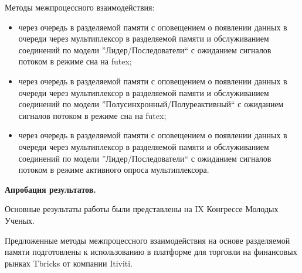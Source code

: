 Методы межпроцессного взаимодействия:
\begin{itemize}
\item через очередь в разделяемой памяти с оповещением о появлении данных в очереди через мультиплексор в разделяемой памяти и обслуживанием соединений по модели ''Лидер/Последователи`` с ожиданием сигналов потоком в режиме сна на futex;
\item через очередь в разделяемой памяти с оповещением о появлении данных в очереди через мультиплексор в разделяемой памяти и обслуживанием соединений по модели ''Полусинхронный/Полуреактивный`` с ожиданием сигналов потоком в режиме сна на futex;
\item через очередь в разделяемой памяти с оповещением о появлении данных в очереди через мультиплексор в разделяемой памяти и обслуживанием соединений по модели ''Лидер/Последователи`` с ожиданием сигналов потоком в режиме активного опроса мультиплексора.
\end{itemize}


\textbf{Апробация результатов.}

Основные результаты работы были представлены на IX Конгрессе Молодых Ученых.

Предложенные методы межпроцессного взаимодействия на основе разделяемой памяти подготовлены к использованию в платформе для торговли на финансовых рынках Tbricks от компании Itiviti.
